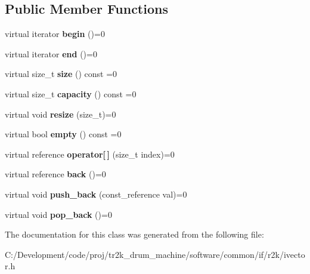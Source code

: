 \subsection*{Public Member Functions}
\begin{DoxyCompactItemize}
\item 
\mbox{\label{classr2k_1_1ivector_aa12c372c0503ee0f44686552673ef196}} 
virtual iterator {\bfseries begin} ()=0
\item 
\mbox{\label{classr2k_1_1ivector_a3f135257b47c1be208937eda8e28c2fc}} 
virtual iterator {\bfseries end} ()=0
\item 
\mbox{\label{classr2k_1_1ivector_a6b3b9b7efad8ae22e7e66105622fcb7f}} 
virtual size\+\_\+t {\bfseries size} () const =0
\item 
\mbox{\label{classr2k_1_1ivector_afed775f0a705c51683bc01a0b28f5f84}} 
virtual size\+\_\+t {\bfseries capacity} () const =0
\item 
\mbox{\label{classr2k_1_1ivector_aacd84b901da083ef9967da23085841d8}} 
virtual void {\bfseries resize} (size\+\_\+t)=0
\item 
\mbox{\label{classr2k_1_1ivector_a9254e80c621114b589a990f8c76e930a}} 
virtual bool {\bfseries empty} () const =0
\item 
\mbox{\label{classr2k_1_1ivector_a2f260ae445e62901bef166d2ba02d88d}} 
virtual reference {\bfseries operator\mbox{[}$\,$\mbox{]}} (size\+\_\+t index)=0
\item 
\mbox{\label{classr2k_1_1ivector_ae4cafbfcdd7dae88a7fab06e26ecb470}} 
virtual reference {\bfseries back} ()=0
\item 
\mbox{\label{classr2k_1_1ivector_aab84081f12ca539f11ae5027e9441882}} 
virtual void {\bfseries push\+\_\+back} (const\+\_\+reference val)=0
\item 
\mbox{\label{classr2k_1_1ivector_ab4565993d539642c5ae4cef03fd096a3}} 
virtual void {\bfseries pop\+\_\+back} ()=0
\end{DoxyCompactItemize}


The documentation for this class was generated from the following file\+:\begin{DoxyCompactItemize}
\item 
C\+:/\+Development/code/proj/tr2k\+\_\+drum\+\_\+machine/software/common/if/r2k/ivector.\+h\end{DoxyCompactItemize}
